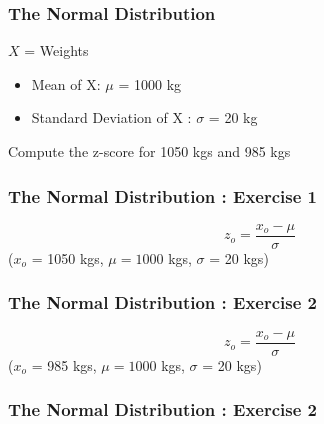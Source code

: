 \documentclass{beamer}
\begin{document}


\begin{frame}
\frametitle{The Normal Distribution}

{\Large

$X$ = Weights
\bigskip
\begin{itemize}
\item Mean of X:  $\mu$ = 1000 kg 
\item Standard Deviation of X : $\sigma$ = 20 kg
\end{itemize}
\bigskip
}
{\LARGE
Compute the z-score for 1050 kgs and 985 kgs

}
\end{frame}

\begin{frame}
\frametitle{The Normal Distribution :  Exercise 1}
{\LARGE

\vspace{-2.9cm}
\[ z_o = \frac{x_o - \mu}{\sigma}  \]
($x_o$ = 1050 kgs, $\mu = 1000$ kgs, $\sigma$ = 20 kgs)





}
\end{frame}

\begin{frame}
\frametitle{The Normal Distribution :  Exercise 2}
{\LARGE

\vspace{-2.9cm}
\[ z_o = \frac{x_o - \mu}{\sigma}  \]
($x_o$ = 985 kgs, $\mu = 1000$ kgs, $\sigma$ = 20 kgs)





}
\end{frame}
\begin{frame}
\frametitle{The Normal Distribution :  Exercise 2}

\end{frame}
\end{document}
